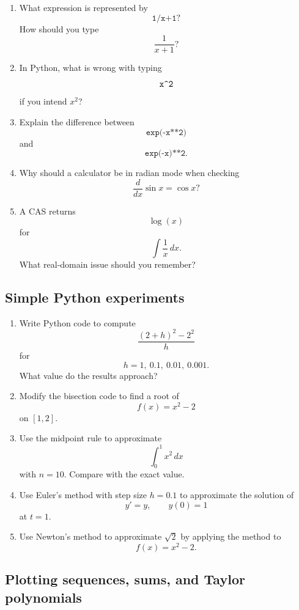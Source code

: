 \begin{enumerate}
\item What expression is represented by
\[
\texttt{1/x+1}?
\]
How should you type
\[
\frac1{x+1}?
\]

\item In Python, what is wrong with typing
\[
\texttt{x\string^2}
\]
if you intend \(x^2\)?

\item Explain the difference between
\[
\texttt{exp(-x**2)}
\]
and
\[
\texttt{exp(-x)**2}.
\]

\item Why should a calculator be in radian mode when checking
\[
\frac{d}{dx}\sin x=\cos x?
\]

\item A CAS returns
\[
\log(x)
\]
for
\[
\int \frac1x\,dx.
\]
What real-domain issue should you remember?
\end{enumerate}

\subsection*{Simple Python experiments}

\begin{enumerate}
\item Write Python code to compute
\[
\frac{(2+h)^2-2^2}{h}
\]
for
\[
h=1,\ 0.1,\ 0.01,\ 0.001.
\]
What value do the results approach?

\item Modify the bisection code to find a root of
\[
f(x)=x^2-2
\]
on \([1,2]\).

\item Use the midpoint rule to approximate
\[
\int_0^1 x^2\,dx
\]
with \(n=10\).  Compare with the exact value.

\item Use Euler's method with step size \(h=0.1\) to approximate the solution of
\[
y'=y,\qquad y(0)=1
\]
at \(t=1\).

\item Use Newton's method to approximate \(\sqrt2\) by applying the method to
\[
f(x)=x^2-2.
\]
\end{enumerate}

\subsection*{Plotting sequences, sums, and Taylor polynomials}

